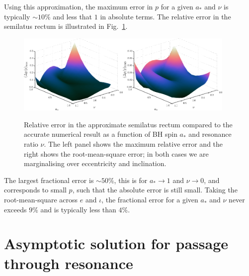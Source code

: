 \documentclass[aps,prd,amsfonts,amssymb,amsmath,nofootinbib,showpacs,superscriptaddress,twocolumn]{revtex4}
\newcommand{\figref}[1]{Fig.~\ref{fig:#1}}
\begin{document}
Using this approximation, the maximum error in $p$ for a given $a_\ast$ and $\nu$ is typically $\sim10\%$ and less that $1$ in absolute terms. The relative error in the semilatus rectum is illustrated in \figref{p-error}. 
\begin{figure}[htp]
\centering
\centerline{\includegraphics[width=0.47\textwidth]{Fig_fit-error-max-plane}\quad\includegraphics[width=0.47\textwidth]{Fig_fit-error-RMS-plane}}
\caption{\label{fig:p-error}Relative error in the approximate semilatus rectum compared to the accurate numerical result as a function of BH spin $a_\ast$ and resonance ratio $\nu$. The left panel shows the maximum relative error and the right shows the root-mean-square error; in both cases we are marginalising over eccentricity and inclination.}
\end{figure}
The largest fractional error is $\sim50\%$, this is for $a_\ast \rightarrow 1$ and $\nu \rightarrow 0$, and corresponds to small $p$, such that the absolute error is still small. Taking the root-mean-square across $e$ and $\iota$, the fractional error for a given $a_\ast$ and $\nu$ never exceeds $9\%$ and is typically less than $4\%$.

\section{Asymptotic solution for passage through resonance}\label{sec:res-asymptotic}




\end{document}
